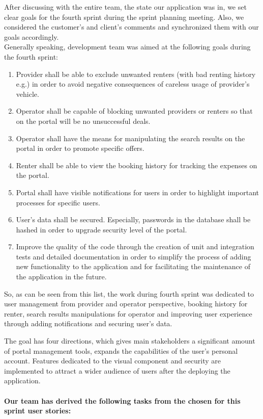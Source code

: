 After discussing with the entire team, the state our application was in,
 we set clear goals for the fourth sprint during the sprint planning 
 meeting. Also, we considered the customer's and client’s comments and
synchronized them with our goals accordingly.\\Generally speaking, development team was aimed at the following goals during the fourth sprint: 
\begin{enumerate}
	\item Provider shall be able to exclude unwanted renters (with bad renting history e.g.) in order to avoid negative consequences of careless usage of provider’s vehicle.
	\item Operator shall be capable of blocking unwanted providers or renters so that on the portal will be no unsuccessful deals.
	\item Operator shall have the means for manipulating the search results on the portal in order to promote specific offers. 
	\item Renter shall be able to view the booking history for tracking the expenses on the portal.
	\item Portal shall have visible notifications for users in order to highlight important processes for specific users.
	\item User’s data shall be secured. Especially, passwords in the database shall be hashed in order to upgrade security level of the portal. 
	\item Improve the quality of the code through the creation of unit and integration tests and detailed documentation in order to simplify the process of adding new functionality to the application and for facilitating the maintenance of the application in the future.
\end{enumerate}
So, as can be seen from this list, the work during fourth sprint was dedicated to 
user management from provider and operator perspective, booking history for renter, 
search results manipulations for operator and improving user experience through 
adding notifications and securing user’s data.  

The goal has four directions, which gives 
main stakeholders a significant amount of portal management tools, expands the 
capabilities of the user's personal account. Features dedicated to the visual 
component and security are implemented to attract a wider audience of users after 
the deploying the application.

\pagebreak
\paragraph{Our team has derived the following tasks from the chosen for this sprint user stories: \newline \newline}

